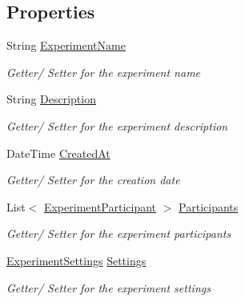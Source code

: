 \subsection*{Properties}
\begin{DoxyCompactItemize}
\item 
String \hyperlink{class_web_analyzer_1_1_models_1_1_base_1_1_experiment_model_ac638be077683d6707e49ca4ae481a0b1}{Experiment\+Name}
\begin{DoxyCompactList}\small\item\em Getter/ Setter for the experiment name \end{DoxyCompactList}\item 
String \hyperlink{class_web_analyzer_1_1_models_1_1_base_1_1_experiment_model_a3f18f9046fa10178e80e77cb433af681}{Description}
\begin{DoxyCompactList}\small\item\em Getter/ Setter for the experiment description \end{DoxyCompactList}\item 
Date\+Time \hyperlink{class_web_analyzer_1_1_models_1_1_base_1_1_experiment_model_a8f50de0ba85fe31f3db2a194a66ed084}{Created\+At}
\begin{DoxyCompactList}\small\item\em Getter/ Setter for the creation date \end{DoxyCompactList}\item 
List$<$ \hyperlink{class_web_analyzer_1_1_models_1_1_base_1_1_experiment_participant}{Experiment\+Participant} $>$ \hyperlink{class_web_analyzer_1_1_models_1_1_base_1_1_experiment_model_a2429c903e1bd2b062452cfa648238380}{Participants}
\begin{DoxyCompactList}\small\item\em Getter/ Setter for the experiment participants \end{DoxyCompactList}\item 
\hyperlink{class_web_analyzer_1_1_models_1_1_settings_model_1_1_experiment_settings}{Experiment\+Settings} \hyperlink{class_web_analyzer_1_1_models_1_1_base_1_1_experiment_model_a00e6e2b80147ab73fc0eee0e7c20d856}{Settings}
\begin{DoxyCompactList}\small\item\em Getter/ Setter for the experiment settings \end{DoxyCompactList}\end{DoxyCompactItemize}
